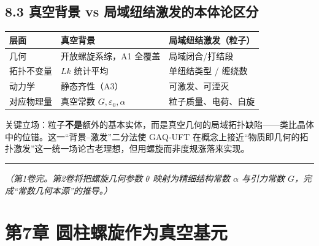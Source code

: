 \subsection{8.3 真空背景 vs
局域纽结激发的本体论区分}\label{ux771fux7a7aux80ccux666f-vs-ux5c40ux57dfux7ebdux7ed3ux6fc0ux53d1ux7684ux672cux4f53ux8bbaux533aux5206}

\begin{longtable}[]{@{}
  >{\raggedright\arraybackslash}p{}
  >{\raggedright\arraybackslash}p{}
  >{\raggedright\arraybackslash}p{}@{}}
\toprule\noalign{}
\begin{minipage}[b]{\linewidth}\raggedright
层面
\end{minipage} & \begin{minipage}[b]{\linewidth}\raggedright
真空背景
\end{minipage} & \begin{minipage}[b]{\linewidth}\raggedright
局域纽结激发（粒子）
\end{minipage} \\
\midrule\noalign{}
\endhead
\bottomrule\noalign{}
\endlastfoot
几何 & 开放螺旋系综，A1 全覆盖 & 局域闭合/打结段 \\
拓扑不变量 & \(Lk\) 统计平均 & 单纽结类型 / 缠绕数 \\
动力学 & 静态齐性（A3） & 可激发、可湮灭 \\
对应物理量 & 真空常数 \(G,\varepsilon_0,\alpha\) &
粒子质量、电荷、自旋 \\
\end{longtable}

关键立场：粒子\textbf{不是}额外的基本实体，而是真空几何的局域拓扑缺陷------类比晶体中的位错。这一``背景--激发''二分法使
GAQ‑UFT
在概念上接近``物质即几何的拓扑激发''这一统一场论古老理想，但用螺旋而非度规涨落来实现。

\begin{center}\rule{0.5\linewidth}{0.5pt}\end{center}

\emph{（第1卷完。第2卷将把螺旋几何参数 \(\theta\) 映射为精细结构常数
\(\alpha\) 与引力常数 \(G\)，完成``常数几何本源''的推导。）}

\section{第7章
圆柱螺旋作为真空基元}\label{ux7b2c7ux7ae0-ux5706ux67f1ux87baux65cbux4f5cux4e3aux771fux7a7aux57faux5143-1}

